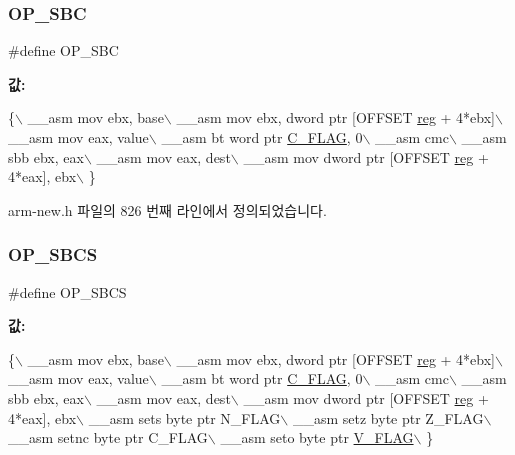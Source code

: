\subsubsection{\texorpdfstring{O\+P\+\_\+\+S\+BC}{OP\_SBC}\hspace{0.1cm}{\footnotesize\ttfamily [2/2]}}
{\footnotesize\ttfamily \#define O\+P\+\_\+\+S\+BC}

{\bfseries 값\+:}
\begin{DoxyCode}
\{\(\backslash\)
        \_\_asm mov ebx, base\(\backslash\)
        \_\_asm mov ebx, dword ptr [OFFSET \mbox{\hyperlink{_g_b_a_8h_ae29faba89509024ffd1a292badcedf2d}{reg}} + 4*ebx]\(\backslash\)
        \_\_asm mov eax, value\(\backslash\)
        \_\_asm bt word ptr \mbox{\hyperlink{_g_b_8h_aa29c80f7f7f901ec7a2c57887f56585d}{C\_FLAG}}, 0\(\backslash\)
        \_\_asm cmc\(\backslash\)
        \_\_asm sbb ebx, eax\(\backslash\)
        \_\_asm mov eax, dest\(\backslash\)
        \_\_asm mov dword ptr [OFFSET \mbox{\hyperlink{_g_b_a_8h_ae29faba89509024ffd1a292badcedf2d}{reg}} + 4*eax], ebx\(\backslash\)
      \}
\end{DoxyCode}


arm-\/new.\+h 파일의 826 번째 라인에서 정의되었습니다.

\mbox{\label{_g_b_a_8cpp_a08f070383f5881f32a9b8e39071b6cc3}} 
\subsubsection{\texorpdfstring{O\+P\+\_\+\+S\+B\+CS}{OP\_SBCS}\hspace{0.1cm}{\footnotesize\ttfamily [1/2]}}
{\footnotesize\ttfamily \#define O\+P\+\_\+\+S\+B\+CS}

{\bfseries 값\+:}
\begin{DoxyCode}
\{\(\backslash\)
        \_\_asm mov ebx, base\(\backslash\)
        \_\_asm mov ebx, dword ptr [OFFSET \mbox{\hyperlink{_g_b_a_8h_ae29faba89509024ffd1a292badcedf2d}{reg}} + 4*ebx]\(\backslash\)
        \_\_asm mov eax, value\(\backslash\)
        \_\_asm bt word ptr \mbox{\hyperlink{_g_b_8h_aa29c80f7f7f901ec7a2c57887f56585d}{C\_FLAG}}, 0\(\backslash\)
        \_\_asm cmc\(\backslash\)
        \_\_asm sbb ebx, eax\(\backslash\)
        \_\_asm mov eax, dest\(\backslash\)
        \_\_asm mov dword ptr [OFFSET \mbox{\hyperlink{_g_b_a_8h_ae29faba89509024ffd1a292badcedf2d}{reg}} + 4*eax], ebx\(\backslash\)
        \_\_asm sets byte ptr N\_FLAG\(\backslash\)
        \_\_asm setz byte ptr Z\_FLAG\(\backslash\)
        \_\_asm setnc byte ptr C\_FLAG\(\backslash\)
        \_\_asm seto byte ptr \mbox{\hyperlink{_g_b_a_8h_a11a0e7b14a93be5eb2720b0151900919}{V\_FLAG}}\(\backslash\)
      \}
\end{DoxyCode}
\mbox{\label{arm-new_8h_a08f070383f5881f32a9b8e39071b6cc3}} 
